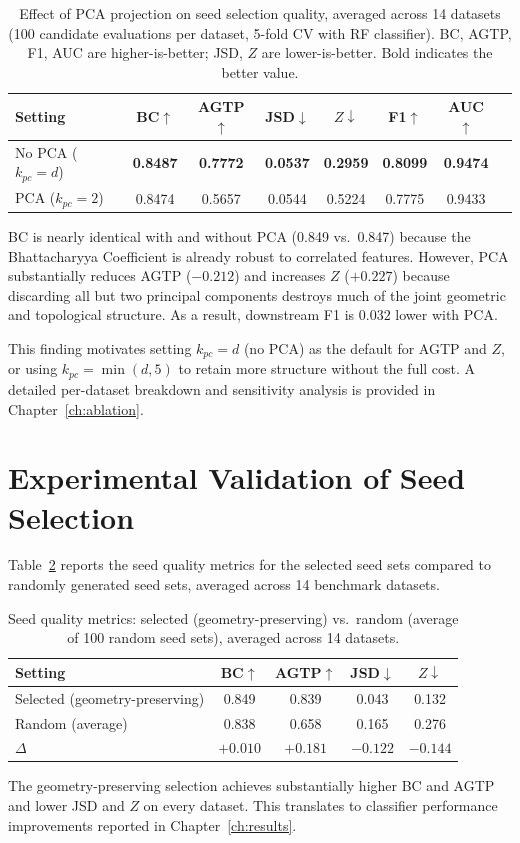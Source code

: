 \begin{table}[ht]
\centering
\caption{Effect of PCA projection on seed selection quality, averaged across 14 datasets (100 candidate evaluations per dataset, 5-fold CV with RF classifier). BC, AGTP, F1, AUC are higher-is-better; JSD, $Z$ are lower-is-better. Bold indicates the better value.}
\label{tab:seed:pca_ablation}
\begin{tabular}{lccccccc}
\toprule
\textbf{Setting} & \textbf{BC$\uparrow$} & \textbf{AGTP$\uparrow$} & \textbf{JSD$\downarrow$} & $Z\downarrow$ & \textbf{F1$\uparrow$} & \textbf{AUC$\uparrow$} \\
\midrule
No PCA ($k_{pc} = d$) & \textbf{0.8487} & \textbf{0.7772} & \textbf{0.0537} & \textbf{0.2959} & \textbf{0.8099} & \textbf{0.9474} \\
PCA ($k_{pc} = 2$)    & 0.8474 & 0.5657 & 0.0544 & 0.5224 & 0.7775 & 0.9433 \\
\bottomrule
\end{tabular}
\end{table}

BC is nearly identical with and without PCA (0.849 vs.\ 0.847) because the Bhattacharyya Coefficient is already robust to correlated features.
However, PCA substantially reduces AGTP ($-0.212$) and increases $Z$ ($+0.227$) because discarding all but two principal components destroys much of the joint geometric and topological structure.
As a result, downstream F1 is $0.032$ lower with PCA.

This finding motivates setting $k_{pc} = d$ (no PCA) as the default for AGTP and $Z$, or using $k_{pc} = \min(d, 5)$ to retain more structure without the full cost.
A detailed per-dataset breakdown and sensitivity analysis is provided in Chapter~\ref{ch:ablation}.

\section{Experimental Validation of Seed Selection}
\label{sec:seed:validation}

Table~\ref{tab:seed:quality_summary} reports the seed quality metrics for the selected seed sets compared to randomly generated seed sets, averaged across 14 benchmark datasets.

\begin{table}[ht]
\centering
\caption{Seed quality metrics: selected (geometry-preserving) vs.\ random (average of 100 random seed sets), averaged across 14 datasets.}
\label{tab:seed:quality_summary}
\begin{tabular}{lcccc}
\toprule
\textbf{Setting} & \textbf{BC$\uparrow$} & \textbf{AGTP$\uparrow$} & \textbf{JSD$\downarrow$} & \textbf{$Z\downarrow$} \\
\midrule
Selected (geometry-preserving) & 0.849 & 0.839 & 0.043 & 0.132 \\
Random (average) & 0.838 & 0.658 & 0.165 & 0.276 \\
\midrule
$\Delta$ & $+0.010$ & $+0.181$ & $-0.122$ & $-0.144$ \\
\bottomrule
\end{tabular}
\end{table}

The geometry-preserving selection achieves substantially higher BC and AGTP and lower JSD and $Z$ on every dataset.
This translates to classifier performance improvements reported in Chapter~\ref{ch:results}.
